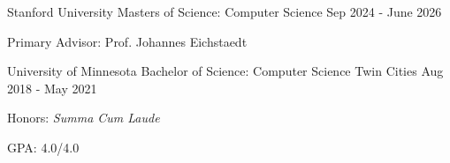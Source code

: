 

\begin{cventries}



  \cveducationentry
    {Stanford University} %
    {Masters of Science: Computer Science} %
    {} %
    {Sep 2024 - June 2026} %
    {
      \begin{cvitems} %
        \item[] {Primary Advisor: Prof. Johannes Eichstaedt}
      \end{cvitems}
    }
    
  \cveducationentry
    {University of Minnesota} %
    {Bachelor of Science: Computer Science} %
    {Twin Cities} %
    {Aug 2018 - May 2021} %
    {
      \begin{cvitems} %
        \item[] {Honors: \emph{Summa Cum Laude}}
        \item[] {GPA: 4.0/4.0}
      \end{cvitems}
    }
\end{cventries}
